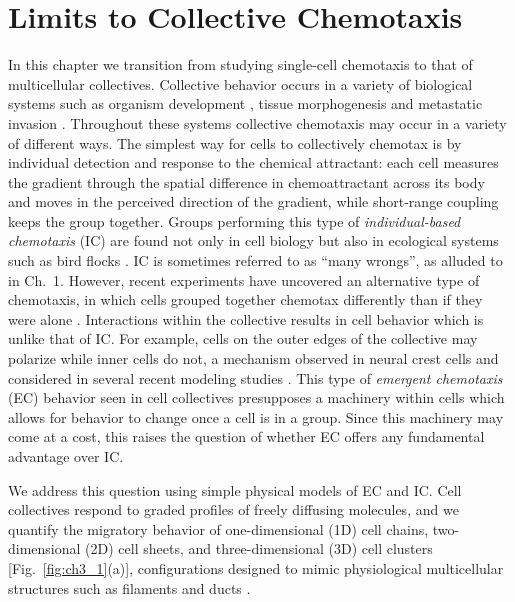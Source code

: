 
\chapter{Limits to Collective Chemotaxis}

In this chapter we transition from studying single-cell chemotaxis to that of multicellular collectives.
Collective behavior occurs in a variety of biological systems such as organism development \cite{theveneau2010collective,cai2016modeling,bianco2007two,montell2008morphogenetic},
tissue morphogenesis \cite{ellison2016cell} and metastatic invasion
\cite{kim2013cooperative,friedl2009collective,friedl2012classifying,deisboeck2009collective}.
Throughout these systems collective chemotaxis may occur in a variety of different ways. The simplest way for cells to collectively chemotax is by individual detection and response to the chemical attractant: each cell measures the gradient through the spatial difference in chemoattractant across its body and moves in the perceived direction of the gradient, while short-range coupling keeps the group together. Groups performing this type of \textit{individual-based chemotaxis} (IC) are found not only in cell biology \cite{kulesa1998neural} but also in ecological systems such as bird flocks \cite{simons2004many}.
IC is sometimes referred to as ``many wrongs'', as alluded to in Ch.\ 1.
However, recent experiments have uncovered an alternative type of chemotaxis, in which cells grouped together chemotax differently than if they were alone \cite{haeger2015collective,malet2015collective,leber2009molecular,gaggioli2007fibroblast}.
Interactions within the collective results in cell behavior which is unlike that of IC.
For example, cells on the outer edges of the collective may polarize while inner cells do not, a mechanism observed in neural crest cells \cite{theveneau2010collective} and considered in several recent modeling studies
\cite{malet2015collective,camley2016emergent,varennes2016collective}. This type of \textit{emergent chemotaxis} (EC) behavior seen in cell collectives presupposes a machinery within cells which allows for behavior to change once a cell is in a group. Since this machinery may come at a cost, this raises the question of whether EC offers any fundamental advantage over IC.

We address this question using simple physical models of EC and IC. Cell collectives respond to graded profiles of freely diffusing molecules, and we quantify the migratory behavior of one-dimensional (1D) cell chains, two-dimensional (2D) cell sheets, and three-dimensional (3D) cell clusters [Fig.\ \ref{fig:ch3_1}(a)], configurations designed to mimic physiological multicellular structures such as filaments and ducts \cite{cheung2013collective,friedl2009collective,bardeesy2002pancreatic}.

